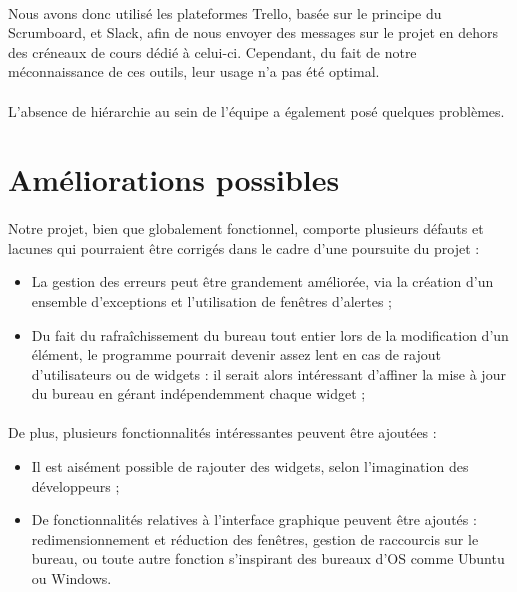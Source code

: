 \paragraph{}
Nous avons donc utilisé les plateformes Trello, basée sur le principe du Scrumboard, et Slack, afin de nous envoyer des messages sur le projet en dehors des créneaux de cours dédié à celui-ci. Cependant, du fait de notre méconnaissance de ces outils, leur usage n'a pas été optimal.

\paragraph{}
L'absence de hiérarchie au sein de l'équipe a également posé quelques problèmes.

\section{Améliorations possibles}

\paragraph{}
Notre projet, bien que globalement fonctionnel, comporte plusieurs défauts et lacunes qui pourraient être corrigés dans le cadre d'une poursuite du projet :
\begin{itemize}
	\item La gestion des erreurs peut être grandement améliorée, via la création d'un ensemble d'exceptions et l'utilisation de fenêtres d'alertes ;
	\item Du fait du rafraîchissement du bureau tout entier lors de la modification d'un élément, le programme pourrait devenir assez lent en cas de rajout d'utilisateurs ou de widgets : il serait alors intéressant d'affiner la mise à jour du bureau en gérant indépendemment chaque widget ;
\end{itemize}

\paragraph{}
De plus, plusieurs fonctionnalités intéressantes peuvent être ajoutées :
\begin{itemize}
	\item Il est aisément possible de rajouter des widgets, selon l'imagination des développeurs ;
	\item De fonctionnalités relatives à l'interface graphique peuvent être ajoutés : redimensionnement et réduction des fenêtres, gestion de raccourcis sur le bureau, ou toute autre fonction s'inspirant des bureaux d'OS comme Ubuntu ou Windows. 
\end{itemize}


